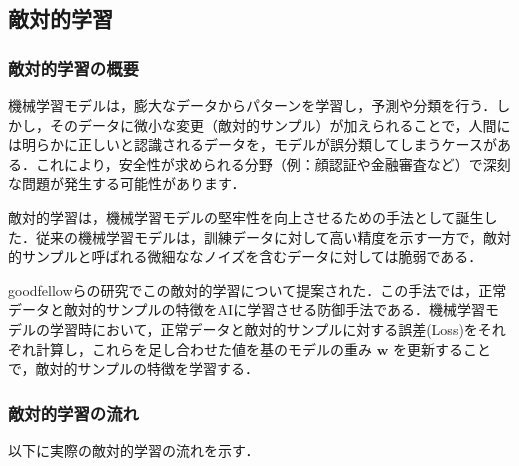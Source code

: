 
\subsection{敵対的学習}
\subsubsection{敵対的学習の概要}
機械学習モデルは，膨大なデータからパターンを学習し，予測や分類を行う．しかし，そのデータに微小な変更（敵対的サンプル）が加えられることで，人間には明らかに正しいと認識されるデータを，モデルが誤分類してしまうケースがある．これにより，安全性が求められる分野（例：顔認証や金融審査など）で深刻な問題が発生する可能性があります．

敵対的学習は，機械学習モデルの堅牢性を向上させるための手法として誕生した．従来の機械学習モデルは，訓練データに対して高い精度を示す一方で，敵対的サンプルと呼ばれる微細ななノイズを含むデータに対しては脆弱である．

goodfellowらの研究\cite{goodfellow2015explaining}でこの敵対的学習について提案された．この手法では，正常データと敵対的サンプルの特徴をAIに学習させる防御手法である．機械学習モデルの学習時において，正常データと敵対的サンプルに対する誤差(Loss)をそれぞれ計算し，これらを足し合わせた値を基のモデルの重み $\bm{w}$ を更新することで，敵対的サンプルの特徴を学習する．

\subsubsection{敵対的学習の流れ}
以下に実際の敵対的学習の流れを示す．\cite{MBSD-AdversarialTraining}

